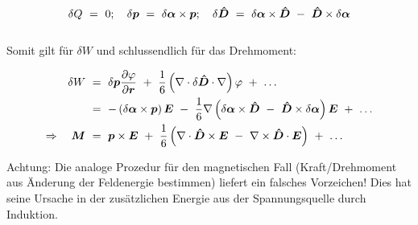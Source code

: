 \begin{equation*}
\delta Q  \ = \ 0 ; \quad \delta\vec{p}  \ = \  \delta\vec{\alpha}\times\vec{p}; \quad \delta\tens{D}  \ = \ \delta\vec{\alpha}\times\tens{D} \ - \ \tens{D}\times\delta\vec{\alpha}
\end{equation*}
\ \\

Somit gilt für $\delta W$ und schlussendlich für das Drehmoment:

\begin{align*}
\delta W  \ &= \  \delta\vec{p} \pdiff{\varphi}{\vec{r}} \ + \ \frac{1}{6}\left(\nabla\cdot\delta\tens{D}\cdot\nabla\right)\varphi \ + \ \ldots\\
&= \ - \left(\delta\vec{\alpha}\times\vec{p}\right)\vec{E} \ - \ \frac{1}{6}\nabla\left(\delta\vec{\alpha}\times\tens{D} \ - \ \tens{D} \times\delta\vec{\alpha}\right)\vec{E} \ +  \ \ldots\\
\Rightarrow\quad \vec{M} \ &= \ \vec{p}\times\vec{E} \ + \ \frac{1}{6}\left(\nabla\cdot\tens{D}\times\vec{E} \ - \ \nabla\times\tens{D}\cdot\vec{E}\right) \ + \ \ldots
\end{align*}

Achtung: Die analoge Prozedur für den magnetischen Fall (Kraft/Drehmoment aus Änderung der Feldenergie bestimmen) liefert ein falsches Vorzeichen! Dies hat seine Ursache in der zusätzlichen Energie aus der Spannungsquelle durch Induktion.